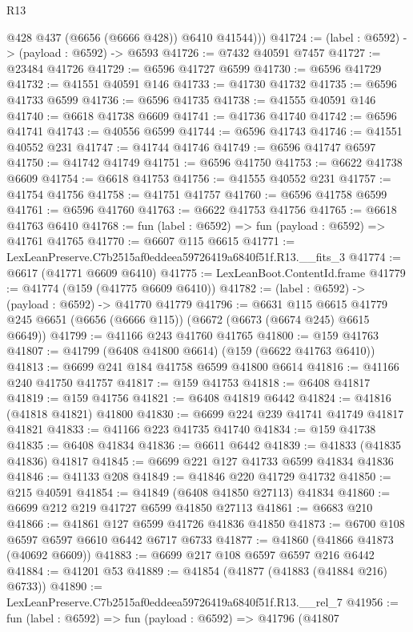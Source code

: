 \begin{lexlean}{R13}
\begin{coremodule}
          @428
          @437
          (@6656 (@6666 @428))
          @6410
          @41544)))
@41724 := (label : @6592) -> (payload : @6592) -> @6593
@41726 := @7432 @40591 @7457
@41727 := @23484 @41726
@41729 := @6596 @41727 @6599
@41730 := @6596 @41729
@41732 := @41551 @40591 @146
@41733 := @41730 @41732
@41735 := @6596 @41733 @6599
@41736 := @6596 @41735
@41738 := @41555 @40591 @146
@41740 := @6618 @41738 @6609
@41741 := @41736 @41740
@41742 := @6596 @41741
@41743 := @40556 @6599
@41744 := @6596 @41743
@41746 := @41551 @40552 @231
@41747 := @41744 @41746
@41749 := @6596 @41747 @6597
@41750 := @41742 @41749
@41751 := @6596 @41750
@41753 := @6622 @41738 @6609
@41754 := @6618 @41753
@41756 := @41555 @40552 @231
@41757 := @41754 @41756
@41758 := @41751 @41757
@41760 := @6596 @41758 @6599
@41761 := @6596 @41760
@41763 := @6622 @41753 @41756
@41765 := @6618 @41763 @6410
@41768 := fun (label : @6592) => fun (payload : @6592) => @41761 @41765
@41770 := @6607 @115 @6615
@41771 := LexLeanPreserve.C7b2515af0eddeea59726419a6840f51f.R13.__fits_3
@41774 := @6617 (@41771 @6609 @6410)
@41775 := LexLeanBoot.ContentId.frame
@41779 := @41774 (@159 (@41775 @6609 @6410))
@41782 := (label : @6592) -> (payload : @6592) -> @41770 @41779
@41796 := @6631
    @115
    @6615
    @41779
    @245
    @6651
    (@6656 (@6666 @115))
    (@6672 (@6673 (@6674 @245) @6615 @6649))
@41799 := @41166 @243 @41760 @41765
@41800 := @159 @41763
@41807 := @41799 (@6408 @41800 @6614) (@159 (@6622 @41763 @6410))
@41813 := @6699 @241 @184 @41758 @6599 @41800 @6614
@41816 := @41166 @240 @41750 @41757
@41817 := @159 @41753
@41818 := @6408 @41817
@41819 := @159 @41756
@41821 := @6408 @41819 @6442
@41824 := @41816 (@41818 @41821) @41800
@41830 := @6699 @224 @239 @41741 @41749 @41817 @41821
@41833 := @41166 @223 @41735 @41740
@41834 := @159 @41738
@41835 := @6408 @41834
@41836 := @6611 @6442
@41839 := @41833 (@41835 @41836) @41817
@41845 := @6699 @221 @127 @41733 @6599 @41834 @41836
@41846 := @41133 @208
@41849 := @41846 @220 @41729 @41732
@41850 := @215 @40591
@41854 := @41849 (@6408 @41850 @27113) @41834
@41860 := @6699 @212 @219 @41727 @6599 @41850 @27113
@41861 := @6683 @210
@41866 := @41861 @127 @6599 @41726 @41836 @41850
@41873 := @6700 @108 @6597 @6597 @6610 @6442 @6717 @6733
@41877 := @41860 (@41866 @41873 (@40692 @6609))
@41883 := @6699 @217 @108 @6597 @6597 @216 @6442
@41884 := @41201 @53
@41889 := @41854 (@41877 (@41883 (@41884 @216) @6733))
@41890 := LexLeanPreserve.C7b2515af0eddeea59726419a6840f51f.R13.__rel_7
@41956 := fun (label : @6592) =>
  fun (payload : @6592) =>
  @41796
    (@41807

\end{coremodule}
\end{lexlean}
